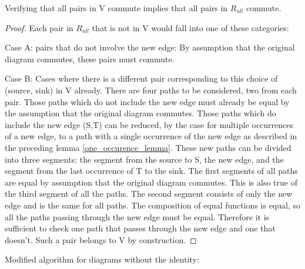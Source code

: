 \documentclass[sigplan,review,anonymous]{acmart}
\begin{document}
\begin{theorem}
\label{verifyingSet}
Verifying that all pairs in V commute implies that all pairs in $R_{all}$ commute.
\end{theorem}
\begin{proof}

Each pair in $R_{all}$ that is not in V would fall into one of these categories:

Case A: pairs that do not involve the new edge: By assumption that the original diagram commutes, these pairs must commute.

Case B: Cases where there is a different pair corresponding to this choice of (source, sink) in V already.
There are four paths to be considered, two from each pair. Those paths which do not include the new edge must already be equal by the assumption that the original diagram commutes.
Those paths which do include the new edge (S,T) can be reduced, by the case for multiple occurrences of a new edge, to a path with a single occurrence of the new edge as described in the preceding lemma \ref{one_occurence_lemma}. These new paths can be divided into three segments: the segment from the source to S, the new edge, and the segment from the last occurrence of T to the sink. The first segments of all paths are equal by assumption that the original diagram commutes. This is also true of the third segment of all the paths. The second segment consists of only the new edge and is the same for all paths. The composition of equal functions is equal, so all the paths passing through the new edge must be equal.
Therefore it is sufficient to check one path that passes through the new edge and one that doesn't. Such a pair belongs to V by construction.
\end{proof}

Modified algorithm for diagrams without the identity:
\end{document}
